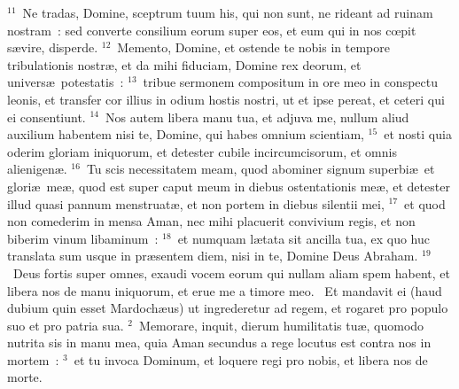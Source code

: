 ${}^{11}$~Ne tradas, Domine, sceptrum tuum his, qui non sunt, ne rideant ad ruinam nostram~: sed converte consilium eorum super eos, et eum qui in nos cœpit s\ae vire, disperde.
${}^{12}$~Memento, Domine, et ostende te nobis in tempore tribulationis nostr\ae , et da mihi fiduciam, Domine rex deorum, et univers\ae\ potestatis~:
${}^{13}$~tribue sermonem compositum in ore meo in conspectu leonis, et transfer cor illius in odium hostis nostri, ut et ipse pereat, et ceteri qui ei consentiunt.
${}^{14}$~Nos autem libera manu tua, et adjuva me, nullum aliud auxilium habentem nisi te, Domine, qui habes omnium scientiam,
${}^{15}$~et nosti quia oderim gloriam iniquorum, et detester cubile incircumcisorum, et omnis alienigen\ae .
${}^{16}$~Tu scis necessitatem meam, quod abominer signum superbi\ae\ et glori\ae\ me\ae , quod est super caput meum in diebus ostentationis me\ae , et detester illud quasi pannum menstruat\ae , et non portem in diebus silentii mei,
${}^{17}$~et quod non comederim in mensa Aman, nec mihi placuerit convivium regis, et non biberim vinum libaminum~:
${}^{18}$~et numquam l\ae tata sit ancilla tua, ex quo huc translata sum usque in pr\ae sentem diem, nisi in te, Domine Deus Abraham.
${}^{19}$~Deus fortis super omnes, exaudi vocem eorum qui nullam aliam spem habent, et libera nos de manu iniquorum, et erue me a timore meo.
~Et mandavit ei (haud dubium quin esset Mardoch\ae us) ut ingrederetur ad regem, et rogaret pro populo suo et pro patria sua.
${}^{2}$~Memorare, inquit, dierum humilitatis tu\ae , quomodo nutrita sis in manu mea, quia Aman secundus a rege locutus est contra nos in mortem~:
${}^{3}$~et tu invoca Dominum, et loquere regi pro nobis, et libera nos de morte.


